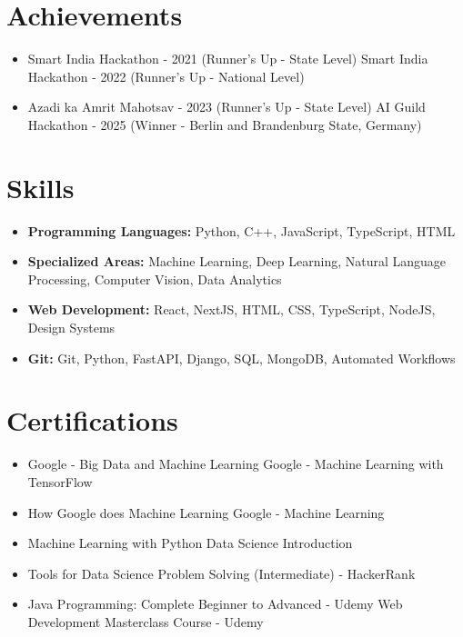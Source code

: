 \documentclass[a4paper,10pt]{article}
\begin{document}
\section*{Achievements}
\begin{itemize}
\item Smart India Hackathon - 2021 (Runner's Up - State Level) \hfill Smart India Hackathon - 2022 (Runner's Up - National Level)
\item Azadi ka Amrit Mahotsav - 2023 (Runner's Up - State Level) \hfill AI Guild Hackathon - 2025 (Winner - Berlin and Brandenburg State, Germany)
\end{itemize}

\section*{Skills}
\begin{itemize}
  \item \textbf{Programming Languages:} Python, C++, JavaScript, TypeScript, HTML
  \item \textbf{Specialized Areas:} Machine Learning, Deep Learning, Natural Language Processing, Computer Vision, Data Analytics
  \item \textbf{Web Development:} React, NextJS, HTML, CSS, TypeScript, NodeJS, Design Systems
  \item \textbf{Git:} Git, Python, FastAPI, Django, SQL, MongoDB, Automated Workflows
\end{itemize}

\section*{Certifications}
\begin{itemize}
\item Google - Big Data and Machine Learning \hfill Google - Machine Learning with TensorFlow
\item How Google does Machine Learning \hfill Google - Machine Learning
\item Machine Learning with Python \hfill Data Science Introduction
\item Tools for Data Science \hfill Problem Solving (Intermediate) - HackerRank
\item Java Programming: Complete Beginner to Advanced - Udemy \hfill Web Development Masterclass Course - Udemy
\end{itemize}
\end{document}

